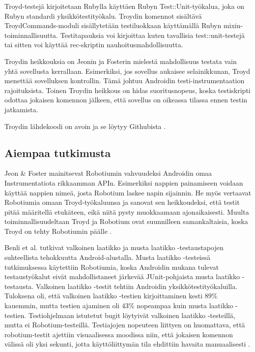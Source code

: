 Troyd-testejä kirjoitetaan Rubylla käyttäen Rubyn Test::Unit-työkalua, joka on Rubyn standardi yksikkötestityökalu. \cite{testunit} Troydin komennot sisältävä TroydCommands-moduli sisällytetään testiluokkaan käyttämällä Rubyn mixin-toiminnallisuutta. Testitapauksia voi kirjoittaa kuten tavallisia test::unit-testejä tai sitten voi käyttää rec-skriptin nauhoitusmahdollisuutta.

Troydin heikkouksia on Jeonin ja Fosterin mielestä mahdollisuus testata vain yhtä sovellusta kerrallaan. Esimerkiksi, jos sovellus aukaisee selainikkunan, Troyd menettää sovelluksen kontrollin. Tämä johtuu Androidin testi-instrumentaation rajoituksista. Toinen Troydin heikkous on hidas suoritusnopeus, koska testiskripti odottaa jokaisen komennon jälkeen, että sovellus on oikeassa tilassa ennen testin jatkamista. \cite{troyd}

Troydin lähdekoodi on avoin ja se löytyy Githubista \cite{troyd_github}.

\subsection{Aiempaa tutkimusta}

Jeon \& Foster mainitsevat Robotiumin vahvuudeksi Androidin omaa Instrumentatiota rikkaamman APIn. Esimerkiksi nappien painamiseen voidaan käyttää nappien nimeä, josta Robotium laskee napin sijainnin. He myös vertaavat Robotiumia omaan Troyd-työkaluunsa ja sanovat sen heikkoudeksi, että testit pitää määritellä etukäteen, eikä niitä pysty muokkaamaan ajonaikaisesti. Muulta toiminnallisuudeltaan Troyd ja Robotium ovat suunnilleen samankaltaisia, koska Troyd on tehty Robotiumin päälle \cite{troyd}.

Benli et al. tutkivat valkoinen laatikko ja musta laatikko -testaustapojen suhteellista tehokkuutta Android-alustalla. Musta laatikko -testeissä tutkimuksessa käytettiin Robotiumia, koska Androidin mukana tulevat testaustyökalut eivät mahdollistaneet järkevää JUnit-pohjaista musta laatikko -testausta. Valkoinen laatikko -testit tehtiin Androidin yksikkötestityökaluilla. Tuloksena oli, että valkoinen laatikko -testien kirjoittaminen kesti 89\% kauemmin, mutta testien ajaminen oli 43\% nopeampaa kuin musta laatikko -testien. Testiohjelmaan istutetut bugit löytyivät valkoinen laatikko -testeillä, mutta ei Robotium-testeillä. Testiajojen nopeuteen liittyen on huomattava, että robotium-testit ajettiin visuaalisessa moodissa niin, että jokaisen komennon välissä oli yksi sekunti, jotta käyttöliittymän tila ehdittiin havaita manuaalisesti \cite{benli12}.

